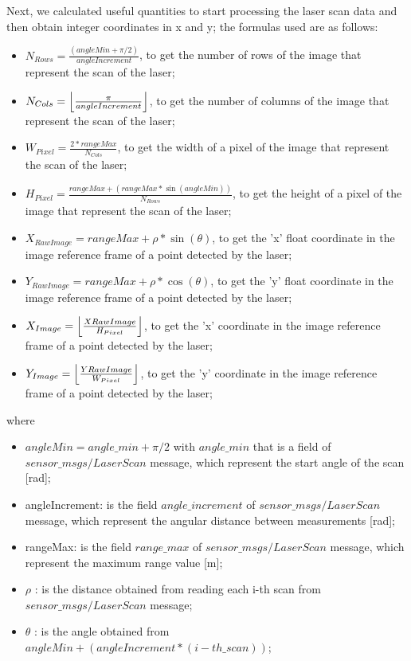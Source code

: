 Next, we calculated useful quantities to start processing the laser scan data and then obtain integer coordinates in x and y; the formulas used are as follows: 
\begin{itemize}
    \item \(N_{Rows} = {\frac{(angleMin + \pi/2)}{angleIncrement}}\), to get the number of rows of the image that represent the scan of the laser;
    \item \(N_{Cols} = \floor*{\frac{\pi}{angleIncrement}}\), to get the number of columns of the image that represent the scan of the laser;
    \item \(W_{Pixel} = \frac{2 * rangeMax}{N_{Cols}}\), to get the width of a pixel of the image that represent the scan of the laser;
    \item \(H_{Pixel} = \frac{rangeMax + (rangeMax*\sin(angleMin))}{N_{Rows}}\), to get the height of a pixel of the image that represent the scan of the laser;
    \item \(X_{RawImage} = rangeMax + \rho * \sin(\theta)\), to get the 'x' float coordinate in the image reference frame of a point detected by the laser;
    \item \(Y_{RawImage} = rangeMax + \rho * \cos(\theta)\), to get the 'y' float coordinate in the image reference frame of a point detected by the laser;
    \item \(X_{Image} = \floor*{\frac{XRawImage}{H_{Pixel}}}\), to get the 'x' coordinate in the image reference frame of a point detected by the laser;
    \item \(Y_{Image} = \floor*{\frac{YRawImage}{W_{Pixel}}}\), to get the 'y' coordinate in the image reference frame of a point detected by the laser;
\end{itemize}
where 
\begin{itemize}
    \item \(angleMin = angle\_min + \pi/2\) with \(angle\_min\) that is a field of \(sensor\_msgs/LaserScan\) message, which represent the start angle of the scan [rad];
    \item angleIncrement: is the field \(angle\_increment\) of \(sensor\_msgs/LaserScan\) message, which represent the angular distance between measurements [rad];
    \item rangeMax: is the field \(range\_max\) of \(sensor\_msgs/LaserScan\) message, which represent the maximum range value [m];
    \item \(\rho\) : is the distance obtained from reading each i-th scan from \(sensor\_msgs/LaserScan\) message;
    \item \(\theta\) : is the angle obtained from \(angleMin + (angleIncrement * (i-th\_scan))\);
\end{itemize}
